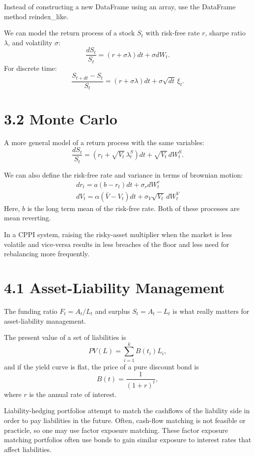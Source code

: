 \documentclass{article}
\begin{document}
Instead of constructing a new DataFrame using an array,
use the DataFrame method reindex\_like.

We can model the return process of a stock $S_t$
with risk-free rate $r$, sharpe ratio $\lambda$,
and volatility $\sigma$: 
\[
\frac{dS_t}{S_t} = 
(r + \sigma \lambda)dt + \sigma dW_t.
\]
For discrete time:
\[
\frac{S_{t+dt} - S_t}{S_t} =
(r + \sigma \lambda)dt +
\sigma \sqrt{dt} \, \xi_t.
\]

\section*{3.2 Monte Carlo}

A more general model of a return process
with the same variables: 
\[
\frac{dS_t}{S_t} = 
\left(r_t + \sqrt{V_t} \, \lambda_t^S\right)dt +
\sqrt{V_t} \, dW_t^S.
\]

We can also define the risk-free rate and variance
in terms of brownian motion: 
\begin{gather}
    dr_t = a(b-r_t)dt + \sigma_r dW_t^r \nonumber \\
    dV_t = \alpha(\bar{V} - V_t)dt + 
    \sigma_V \sqrt{V_t} \, dW_t^V \nonumber
\end{gather}
Here, $b$ is the long term mean of the risk-free rate.
Both of these processes are mean reverting. 

In a CPPI system, raising the risky-asset multiplier
when the market is less volatile and vice-versa results
in less breaches of the floor and less need for 
rebalancing more frequently. 

\section*{4.1 Asset-Liability Management}

The funding ratio $F_t = {A_t}/{L_t}$ and surplus
$S_t = A_t - L_t$ is what really matters
for asset-liability management.  

The present value of a set of liabilities is
\[
PV(L) = \sum_{i=1}^k B(t_i)L_i,
\]
and if the yield curve is flat, 
the price of a pure discount bond is 
\[
B(t) = \frac{1}{(1+r)^t}, 
\]
where $r$ is the annual rate of interest. 

Liability-hedging portfolios attempt to match the cashflows of
the liability side in order to pay liabilities in the future. 
Often, cash-flow matching is not feasible or practicle, so one may
use factor exposure matching. These factor exposure matching portfolios
often use bonds to gain similar exposure to interest rates that affect
liabilities. 
\end{document}
